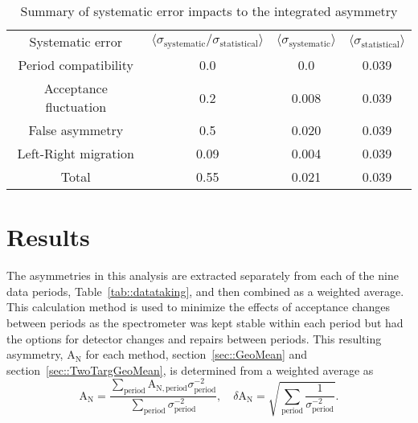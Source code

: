 \begin{table}[h!t]
  \centering
  \begin{tabular}{|c|c|c|c|}
    \hline
    \multirow{2}{*}{Systematic error}&
    \multirow{2}{*}{
      $\langle \sigma_{\mathrm{systematic}}/\sigma_{\mathrm{statistical}}
      \rangle$} &
    \multirow{2}{*}{$\langle \sigma_{\mathrm{systematic}} \rangle$} &
    \multirow{2}{*}{$\langle \sigma_{\mathrm{statistical}} \rangle$} \\
    
    & & & \\ \hline

    Period compatibility& 0.0 & 0.0 & 0.039\\ \hline

    Acceptance fluctuation& 0.2 & 0.008 & 0.039\\ \hline

    False asymmetry& 0.5 & 0.020 & 0.039\\ \hline

    Left-Right migration& 0.09 & 0.004 & 0.039\\ \hline

    Total& 0.55 & 0.021 & 0.039\\\hline
    
  \end{tabular}
  \caption{Summary of systematic error impacts to the integrated asymmetry}
  \label{tab::sysError}
\end{table}


\section{Results}
The asymmetries in this analysis are extracted separately from each of the nine
data periods, Table~\ref{tab::datataking}, and then combined as a weighted
average.  This calculation method is used to minimize the effects of acceptance
changes between periods as the spectrometer was kept stable within each period
but had the options for detector changes and repairs between periods.  This
resulting asymmetry, A$_{\mathrm{N}}$ for each method,
section~\ref{sec::GeoMean} and section~\ref{sec::TwoTargGeoMean}, is determined
from a weighted average as
\begin{equation}
  \label{equ::wAvg}
  \mathrm{A}_{\mathrm{N}} = \frac{
    \sum_{\mathrm{period}}
    \mathrm{A}_{\mathrm{N},\mathrm{period}}\sigma^{-2}_{\mathrm{period}}
  }{
    \sum_{\mathrm{period}} \sigma^{-2}_{\mathrm{period}}},
  \quad \delta \mathrm{A}_{\mathrm{N}} = \sqrt{\sum_{\mathrm{period}}
  \frac{1}{\sigma^{-2}_{\mathrm{period}}
  }}.
\end{equation}

